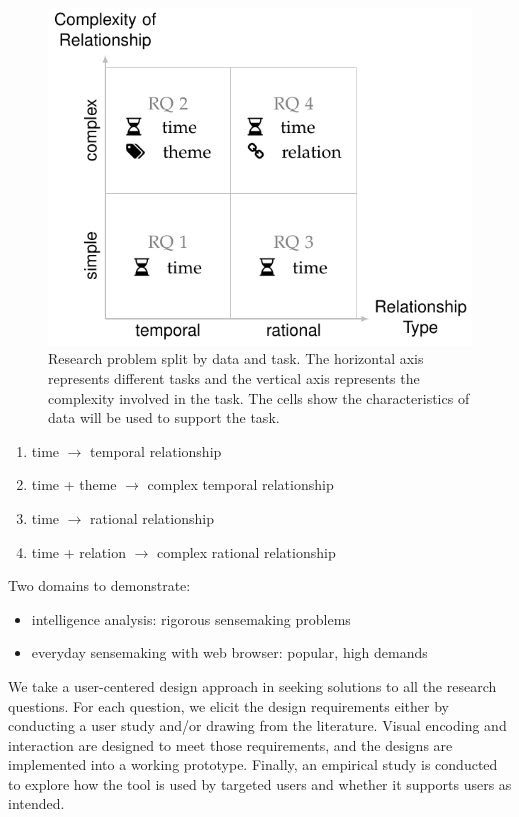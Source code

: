 \begin{figure}[!htb]
	\centering
	\includegraphics{work}
	\caption{Research problem split by data and task. The horizontal axis represents different tasks and the vertical axis represents the complexity involved in the  task. The cells show the characteristics of data will be used to support the task.}
	\label{fig:work}
\end{figure}


\begin{enumerate}
	\item time $\rightarrow$ temporal relationship
	\item time + theme $\rightarrow$ complex temporal relationship
	\item time $\rightarrow$ rational relationship
	\item time + relation $\rightarrow$ complex rational relationship
\end{enumerate}

Two domains to demonstrate:
\begin{itemize}
	\item intelligence analysis: rigorous sensemaking problems
	\item everyday sensemaking with web browser: popular, high demands
\end{itemize}

We take a user-centered design approach in seeking solutions to all the research questions. For each question, we elicit the design requirements either by conducting a user study and/or drawing from the literature. Visual encoding and interaction are designed to meet those requirements, and the designs are implemented into a working prototype. Finally, an empirical study is conducted to explore how the tool is used by targeted users and whether it supports users as intended. 


